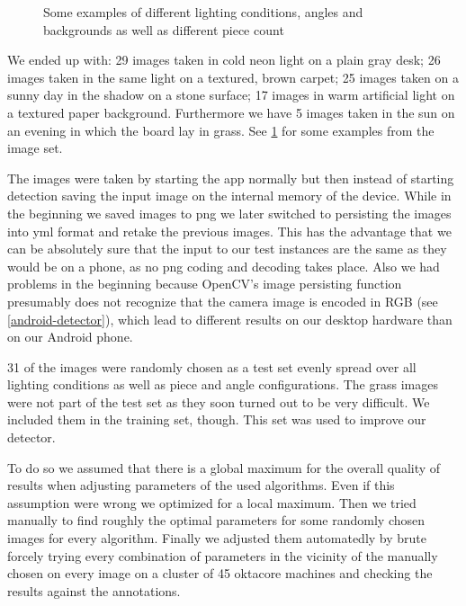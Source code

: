 \begin{figure}
		\caption{Some examples of different lighting conditions, angles and backgrounds as well as different piece count}
		\label{fig:sampeImages}
	\end{figure}

	We ended up with: 29 images taken in cold neon light on a plain gray desk; 26 images taken in the same light on a textured, brown carpet; 25 images taken on a sunny day in the shadow on a stone surface; 17 images in warm artificial light on a textured paper background. Furthermore we have 5 images taken in the sun on an evening in which the board lay in grass. See \ref{fig:sampeImages} for some examples from the image set.

	The images were taken by starting the app normally but then instead of starting detection saving the input image on the internal memory of the device. While in the beginning we saved images to png we later switched to persisting the images into yml format and retake the previous images. This has the advantage that we can be absolutely sure that the input to our test instances are the same as they would be on a phone, as no png coding and decoding takes place. Also we had problems in the beginning because OpenCV's image persisting function presumably does not recognize that the camera image is encoded in RGB (see \ref{android-detector}), which lead to different results on our desktop hardware than on our Android phone.

	31 of the images were randomly chosen as a test set evenly spread over all lighting conditions as well as piece and angle configurations. The grass images were not part of the test set as they soon turned out to be very difficult. We included them in the training set, though. This set was used to improve our detector.

	To do so we assumed that there is a global maximum for the overall quality of results when adjusting parameters of the used algorithms. Even if this assumption were wrong we optimized for a local maximum. Then we tried manually to find roughly the optimal parameters for some randomly chosen images for every algorithm. Finally we adjusted them automatedly by brute forcely trying every combination of parameters in the vicinity of the manually chosen on every image on a cluster of 45 oktacore machines and checking the results against the annotations.

